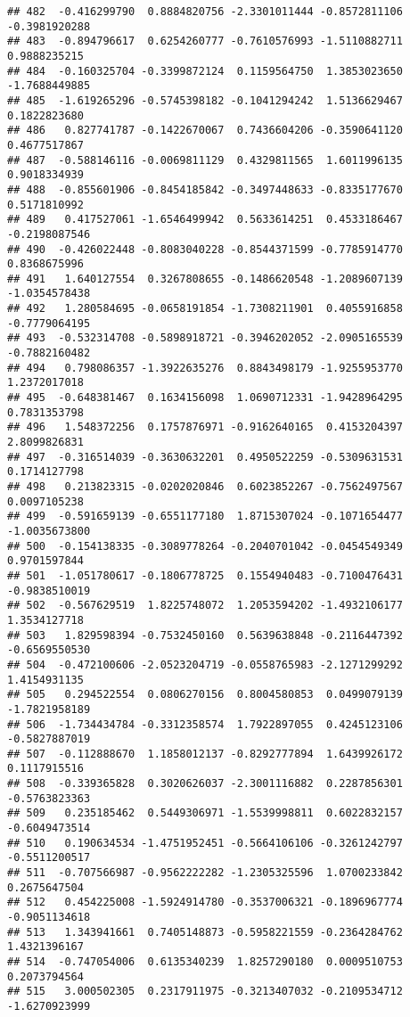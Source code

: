 \documentclass[
]{article}
\begin{document}
\begin{verbatim}
## 482  -0.416299790  0.8884820756 -2.3301011444 -0.8572811106 -0.3981920288
## 483  -0.894796617  0.6254260777 -0.7610576993 -1.5110882711  0.9888235215
## 484  -0.160325704 -0.3399872124  0.1159564750  1.3853023650 -1.7688449885
## 485  -1.619265296 -0.5745398182 -0.1041294242  1.5136629467  0.1822823680
## 486   0.827741787 -0.1422670067  0.7436604206 -0.3590641120  0.4677517867
## 487  -0.588146116 -0.0069811129  0.4329811565  1.6011996135  0.9018334939
## 488  -0.855601906 -0.8454185842 -0.3497448633 -0.8335177670  0.5171810992
## 489   0.417527061 -1.6546499942  0.5633614251  0.4533186467 -0.2198087546
## 490  -0.426022448 -0.8083040228 -0.8544371599 -0.7785914770  0.8368675996
## 491   1.640127554  0.3267808655 -0.1486620548 -1.2089607139 -1.0354578438
## 492   1.280584695 -0.0658191854 -1.7308211901  0.4055916858 -0.7779064195
## 493  -0.532314708 -0.5898918721 -0.3946202052 -2.0905165539 -0.7882160482
## 494   0.798086357 -1.3922635276  0.8843498179 -1.9255953770  1.2372017018
## 495  -0.648381467  0.1634156098  1.0690712331 -1.9428964295  0.7831353798
## 496   1.548372256  0.1757876971 -0.9162640165  0.4153204397  2.8099826831
## 497  -0.316514039 -0.3630632201  0.4950522259 -0.5309631531  0.1714127798
## 498   0.213823315 -0.0202020846  0.6023852267 -0.7562497567  0.0097105238
## 499  -0.591659139 -0.6551177180  1.8715307024 -0.1071654477 -1.0035673800
## 500  -0.154138335 -0.3089778264 -0.2040701042 -0.0454549349  0.9701597844
## 501  -1.051780617 -0.1806778725  0.1554940483 -0.7100476431 -0.9838510019
## 502  -0.567629519  1.8225748072  1.2053594202 -1.4932106177  1.3534127718
## 503   1.829598394 -0.7532450160  0.5639638848 -0.2116447392 -0.6569550530
## 504  -0.472100606 -2.0523204719 -0.0558765983 -2.1271299292  1.4154931135
## 505   0.294522554  0.0806270156  0.8004580853  0.0499079139 -1.7821958189
## 506  -1.734434784 -0.3312358574  1.7922897055  0.4245123106 -0.5827887019
## 507  -0.112888670  1.1858012137 -0.8292777894  1.6439926172  0.1117915516
## 508  -0.339365828  0.3020626037 -2.3001116882  0.2287856301 -0.5763823363
## 509   0.235185462  0.5449306971 -1.5539998811  0.6022832157 -0.6049473514
## 510   0.190634534 -1.4751952451 -0.5664106106 -0.3261242797 -0.5511200517
## 511  -0.707566987 -0.9562222282 -1.2305325596  1.0700233842  0.2675647504
## 512   0.454225008 -1.5924914780 -0.3537006321 -0.1896967774 -0.9051134618
## 513   1.343941661  0.7405148873 -0.5958221559 -0.2364284762  1.4321396167
## 514  -0.747054006  0.6135340239  1.8257290180  0.0009510753  0.2073794564
## 515   3.000502305  0.2317911975 -0.3213407032 -0.2109534712 -1.6270923999

\end{verbatim}
\end{document}
